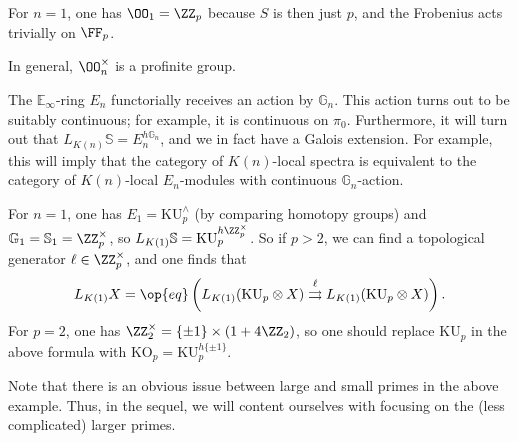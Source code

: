 \documentclass[../notes.tex]{subfiles}
\begin{document}
\begin{example}
	For $n=1$, one has $\OO_1=\ZZ_p$ because $S$ is then just $p$, and the Frobenius acts trivially on $\FF_p$.
\end{example}
\begin{remark}
	In general, $\OO_n^\times$ is a profinite group.
\end{remark}
\begin{remark}
	The $\mathbb E_\infty$-ring $E_n$ functorially receives an action by $\mathbb G_n$. This action turns out to be suitably continuous; for example, it is continuous on $\pi_0$. Furthermore, it will turn out that $L_{K(n)}\mathbb S=E_n^{h\mathbb G_n}$, and we in fact have a Galois extension. For example, this will imply that the category of $K(n)$-local spectra is equivalent to the category of $K(n)$-local $E_n$-modules with continuous $\mathbb G_n$-action.
\end{remark}
\begin{example}
	For $n=1$, one has $E_1=\mathrm{KU}^\land_p$ (by comparing homotopy groups) and $\mathbb G_1=\mathbb S_1=\ZZ_p^\times$, so $L_{K(1)}\mathbb S=\mathrm{KU}_p^{h\ZZ_p^\times}$. So if $p>2$, we can find a topological generator $\ell\in\ZZ_p^\times$, and one finds that
	\[L_{K(1)}X=\op{eq}\left(L_{K(1)}(\mathrm{KU}_p\otimes X)\stackrel\ell\rightrightarrows L_{K(1)}(\mathrm{KU}_p\otimes X)\right).\]
	For $p=2$, one has $\ZZ_2^\times=\{\pm1\}\times(1+4\ZZ_2)$, so one should replace $\mathrm{KU}_p$ in the above formula with $\mathrm{KO}_p=\mathrm{KU}_p^{h\{\pm1\}}$.
\end{example}
Note that there is an obvious issue between large and small primes in the above example. Thus, in the sequel, we will content ourselves with focusing on the (less complicated) larger primes.
\end{document}
